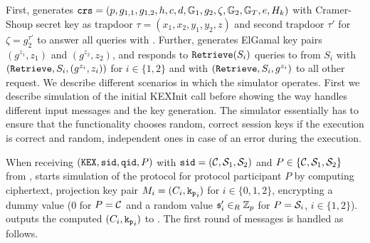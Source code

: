 First, \SIM generates $\mathtt{crs}=(p,g_{1,1},g_{1,2},h,c,d,\mathbb{G}_1,g_{2},\zeta,\mathbb{G}_2,\mathbb{G}_T,e,H_k)$ with Cramer-Shoup secret key as trapdoor $\tau=(x_1,x_2,y_1,y_2,z)$ and second trapdoor $\tau'$ for $\zeta=g_2^{\tau'}$ to answer all \Fcrs queries with \crs.
Further, \SIM generates ElGamal key pairs $(g^{z_1},z_1)$ and $(g^{z_2},z_2)$, and responds to $\mathtt{Retrieve}(S_i)$ queries to \Fca from $S_i$ with $(\mathtt{Retrieve}, S_i, (g^{z_i},z_i))$ for $i\in\{1,2\}$ and with $(\mathtt{Retrieve}, S_i, g^{z_i})$ to all other request.
We describe different scenarios in which the simulator operates.
First we describe simulation of the initial KEXInit call before showing the way \SIM handles different input messages and the key generation.
The simulator essentially has to ensure that the functionality chooses random, correct session keys if the execution is correct and random, independent ones in case of an error during the execution.

% 
        When receiving $(\mathtt{KEX}, \mathtt{sid}, \mathtt{qid}, P)$ with $\mathtt{sid}=(\mathcal{C}, \mathcal{S}_1, \mathcal{S}_2)$ and $P\in\{\mathcal{C}, \mathcal{S}_1, \mathcal{S}_2\}$ from \FTWOPAKE, \SIM starts simulation of the protocol for protocol participant $P$ by computing ciphertext, projection key pair $M_i=(C_i, \mathtt{k_p}_i)$ for $i\in\{0,1,2\}$, encrypting a dummy value ($0$ for $P=\mathcal{C}$ and a random value $\mathfrak{s}'_i\in_R\mathbb{Z}_p$ for $P=\mathcal{S}_i$, $i\in\{1,2\}$).
        \SIM outputs the computed $(C_i, \mathtt{k_p}_i)$ to \cA.
        The first round of messages is handled as follows.
        
